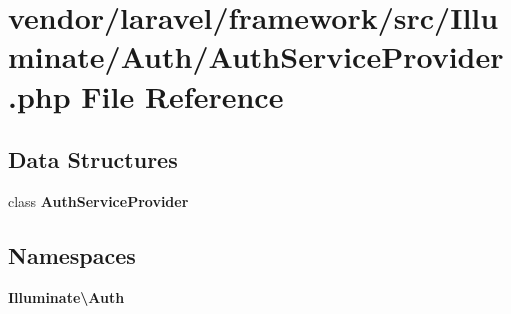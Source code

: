 \section{vendor/laravel/framework/src/\+Illuminate/\+Auth/\+Auth\+Service\+Provider.php File Reference}
\label{_auth_service_provider_8php}
\subsection*{Data Structures}
\begin{DoxyCompactItemize}
\item 
class {\bf Auth\+Service\+Provider}
\end{DoxyCompactItemize}
\subsection*{Namespaces}
\begin{DoxyCompactItemize}
\item 
 {\bf Illuminate\textbackslash{}\+Auth}
\end{DoxyCompactItemize}
